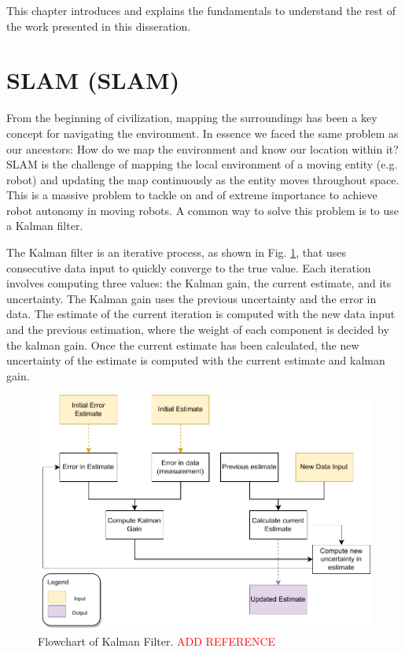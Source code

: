 This chapter introduces and explains the fundamentals to understand the rest of the work presented in this disseration.

\section{\acl*{SLAM} (\acs*{SLAM})}

From the beginning of civilization, mapping the surroundings has been a key concept for navigating the environment. In essence we faced the same problem as our ancestors: How do we map the environment and know our location within it? \acs*{SLAM} is the challenge of mapping the local environment of a moving entity (e.g. robot) and updating the map continuously as the entity moves throughout space. This is a massive problem to tackle on and of extreme importance to achieve robot autonomy in moving robots. A common way to solve this problem is to use a Kalman filter.

The Kalman filter is an iterative process, as shown in Fig. \ref*{fig: flowchart kalman}, that uses consecutive data input to quickly converge to the true value. Each iteration involves computing three values: the Kalman gain, the current estimate, and its uncertainty. The Kalman gain uses the previous uncertainty and the error in data. The estimate of the current iteration is computed with the new data input and the previous estimation, where the weight of each component is decided by the kalman gain. Once the current estimate has been calculated, the new uncertainty of the estimate is computed with the current estimate and kalman gain.

\begin{figure}[H]
    \centering
    \includegraphics[width=0.7\linewidth]{images/background/Kalman-diagram.pdf}
    \caption{Flowchart of Kalman Filter. \textcolor{red}{ADD REFERENCE}}
    \label{fig: flowchart kalman}
\end{figure}


